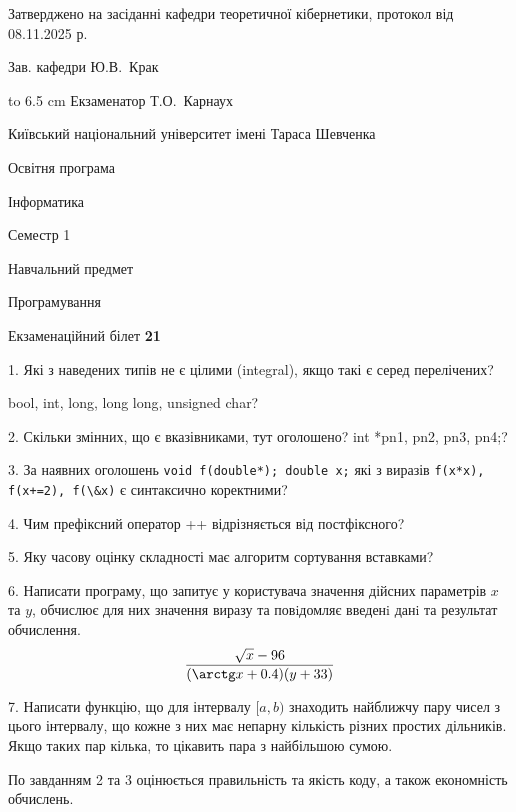 \documentclass[12pt, ukrainian]{article}
\def\code#1{\Verb!#1!}
\begin{document}
{\smallskip\smallskip \begin {scriptsize} Затверджено на засіданні кафедри теоретичної кібернетики, протокол   від   08.11.2025 р.\par\smallskip\smallskip\smallskip\smallskip
{\parbox {6.5 cm} {Зав. кафедри \dotfill Ю.В.~Крак}}\hspace {0.7cm} {\hbox to 6.5 cm { Екзаменатор \dotfill Т.О.~Карнаух}} \end{scriptsize}}
\newpage
{{\begin {scriptsize}\par
{ \center  Київський національний університет імені Тараса Шевченка \par}
{\parbox {5 cm}{Освітня програма \hfill}{\parbox {7 cm}{Інформатика\hfill}}\parbox {6 cm}{\hfill Семестр 1}}\par
{\parbox {5 cm} {Навчальний предмет \hfill}\parbox {7 cm}{Програмування \hfill}\parbox {6cm}{\hfill}\par}\vspace{-15pt} \end{scriptsize}}{\center Екзаменаційний білет \No \textbf { 21 }\par}}
{%
1. Які з наведених типів не є цілими (integral), якщо такі є серед перелічених?

bool, int, long, long long, unsigned char?
\par
\vspace{2mm}
2. Скільки змінних, що є вказівниками, тут оголошено?
int *pn1, pn2, pn3, pn4;?
\par
\vspace{2mm}
3. За наявних оголошень \code{void f(double*); double x;} які з виразів \code{f(x*x), f(x+=2), f(\&x)} є синтаксично коректними?
\par
\vspace{2mm}
4. Чим префіксний оператор ++ відрізняється від постфіксного?
\par
\vspace{2mm}
5. Яку часову оцінку складності має алгоритм сортування вставками?
\par
\vspace{2mm}
6. Написати програму, що запитує у користувача значення дійсних параметрів $x$ та $y$, обчислює для них значення виразу та повiдомляє введенi данi та результат обчислення.
$$\frac{\sqrt x - 96}{(\arctg x + 0.4) (y + 33)}$$ 

\par
7. Написати функцію, що для інтервалу $[a, b)$ знаходить найближчу пару чисел з цього інтервалу, що кожне з них має непарну кількість різних простих дільників. Якщо таких пар кілька, то цікавить пара з найбільшою сумою.

По завданням 2 та 3 оцінюється правильність та якість коду, а також економність обчислень.

}
\end{document}
